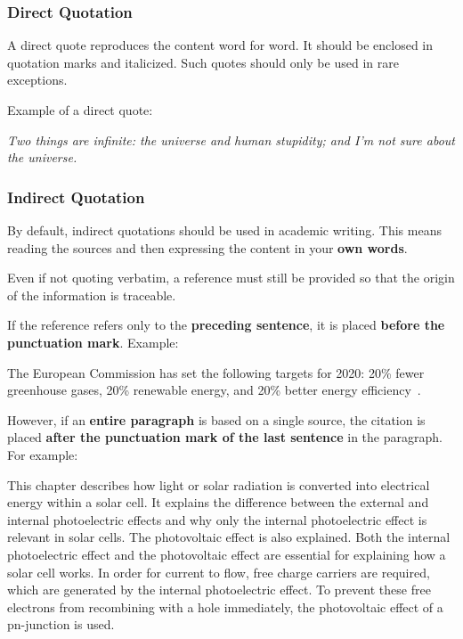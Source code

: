 \subsubsection{Direct Quotation}
\label{sec:directQuotation}

A direct quote reproduces the content word for word. It should be enclosed in quotation marks and italicized. Such quotes should only be used in rare exceptions.

Example of a direct quote:

\begin{center}
		{\glqq}\textit{Two things are infinite: the universe and human stupidity; and I'm not sure about the universe.}{\grqq} \cite{Einstein1941}
\end{center}


\subsubsection{Indirect Quotation}
\label{sec:indirectQuotation}

By default, indirect quotations should be used in academic writing. This means reading the sources and then expressing the content in your \textbf{own words}.

Even if not quoting verbatim, a reference must still be provided so that the origin of the information is traceable.

If the reference refers only to the \textbf{preceding sentence}, it is placed \textbf{before the punctuation mark}. Example:

The European Commission has set the following targets for 2020: 20\% fewer greenhouse gases, 20\% renewable energy, and 20\% better energy efficiency~\cite{EC2008}.

However, if an \textbf{entire paragraph} is based on a single source, the citation is placed \textbf{after the punctuation mark of the last sentence} in the paragraph. For example:

This chapter describes how light or solar radiation is converted into electrical energy within a solar cell. It explains the difference between the external and internal photoelectric effects and why only the internal photoelectric effect is relevant in solar cells. The photovoltaic effect is also explained. Both the internal photoelectric effect and the photovoltaic effect are essential for explaining how a solar cell works. In order for current to flow, free charge carriers are required, which are generated by the internal photoelectric effect. To prevent these free electrons from recombining with a hole immediately, the photovoltaic effect of a pn-junction is used.~\cite{Finke2012}

